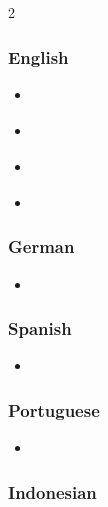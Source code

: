 \begin{multicols}{2}
\subsubsection{English}

\begin{itemize}

 \item \autocite{mai:lang2022becomeappinventor}
 \item \autocite{mai:ibrahim2026appinventorai}
 \item \autocite{mai:logan2019learntoprogram}
 \item \autocite{mai:guthals2017buildingmobileapp}

\end{itemize}

\subsubsection{German}

\begin{itemize}

 \item \autocite{mai:eisenmann2024meineerstenapps}

\end{itemize}

\subsubsection{Spanish}

\begin{itemize}

 \item \autocite{mai:martinvargas2020aprendejuegos}

\end{itemize}

\subsubsection{Portuguese}

\begin{itemize}

 \item \autocite{mai:gomez2017androidarduino}

\end{itemize}

\subsubsection{Indonesian}


\end{multicols}
